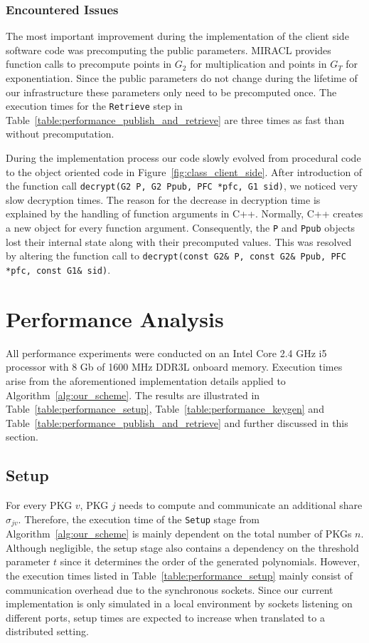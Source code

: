 \subsubsection{Encountered Issues}
The most important improvement during the implementation of the client side software code was precomputing the public parameters. MIRACL provides function calls to precompute points in $G_2$ for multiplication and points in $G_T$ for exponentiation. Since the public parameters do not change during the lifetime of our infrastructure these parameters only need to be precomputed once. The execution times for the \texttt{Retrieve} step in Table~\ref{table:performance_publish_and_retrieve} are three times as fast than without precomputation.

During the implementation process our code slowly evolved from procedural code to the object oriented code in Figure~\ref{fig:class_client_side}. After introduction of the function call \texttt{decrypt(G2 P, G2 Ppub, PFC *pfc, G1 s\textunderscore id)}, we noticed very slow decryption times. The reason for the decrease in decryption time is explained by the handling of function arguments in C++. Normally, C++ creates a new object for every function argument. Consequently, the \texttt{P} and \texttt{Ppub} objects lost their internal state along with their precomputed values. This was resolved by altering the function call to \texttt{decrypt(const G2\& P, const G2\& Ppub, PFC *pfc, const G1\& s\textunderscore id)}.

\section{Performance Analysis}
\label{sec:performance_analysis}
All performance experiments were conducted on an Intel Core 2.4 GHz i5 processor with 8 Gb of 1600 MHz DDR3L onboard memory. Execution times arise from the aforementioned implementation details applied to Algorithm~\ref{alg:our_scheme}. The results are illustrated in Table~\ref{table:performance_setup}, Table~\ref{table:performance_keygen} and Table~\ref{table:performance_publish_and_retrieve} and further discussed in this section.

\subsection{Setup}
For every PKG $v$, PKG $j$ needs to compute and communicate an additional share $\sigma_{jv}$. Therefore, the execution time of the \texttt{Setup} stage from Algorithm~\ref{alg:our_scheme} is mainly dependent on the total number of PKGs $n$. Although negligible, the setup stage also contains a dependency on the threshold parameter $t$ since it determines the order of the generated polynomials. However, the execution times listed in Table~\ref{table:performance_setup} mainly consist of communication overhead due to the synchronous sockets. Since our current implementation is only simulated in a local environment by sockets listening on different ports, setup times are expected to increase when translated to a distributed setting.

